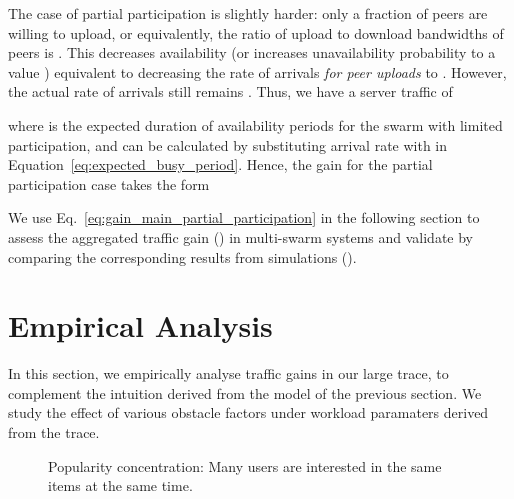 \documentclass[10pt, conference, letterpaper]{IEEEtran}
\begin{document}
The case of partial participation is slightly harder: only a fraction  of  peers are willing to upload, or equivalently,  the ratio of upload to download bandwidths of peers is . This decreases availability (or increases unavailability probability to a value ) equivalent to decreasing the rate of arrivals \emph{for peer uploads} to . However, the actual rate of arrivals still remains . Thus, we have  a server traffic of 
   
where  is the expected duration of availability periods for the swarm  with limited participation, and can be calculated by substituting arrival rate with  in Equation~\ref{eq:expected_busy_period}. Hence, the gain for the partial participation case takes the form
   
We use Eq.~\ref{eq:gain_main_partial_participation} in the following section to assess the aggregated traffic gain () in multi-swarm systems and validate by comparing the corresponding results from simulations ().



 \section{Empirical Analysis}
\label{sec:system}




In this section, we empirically analyse  traffic gains in our large trace, to complement the intuition derived from the model of the previous section. We  study the effect of various obstacle factors under workload paramaters derived from the trace. 

\begin{figure}
\hspace{1em}
\caption{Popularity concentration: Many users are interested in the same items at the same time.}\vspace{-4mm}
\end{figure}
\end{document}
